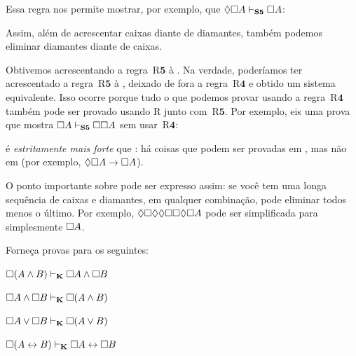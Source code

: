 Essa regra nos permite mostrar, por exemplo, que $\Diamond\Box A\vdash_{\mathbf{S5}}  \Box A$:
\begin{fitchproof}
	\PR
	\open
	\AS
	\open
	\AS
	\close
	\close
\end{fitchproof}

Assim, além de acrescentar caixas diante de diamantes, também podemos eliminar diamantes diante de caixas.

Obtivemos \mlSfive{} acrescentando a regra~R$\mathbf{5}$ à \mlSfour. Na
verdade, poderíamos ter acrescentado a regra~R$\mathbf{5}$ à \mlT{}, deixado de fora a
regra~R$\mathbf{4}$ e obtido um sistema equivalente. Isso ocorre porque
tudo o que podemos provar usando a regra~R$\mathbf{4}$ também pode ser provado
usando R\mlT{} junto com~R$\mathbf{5}$. Por exemplo, eis uma
prova que mostra $\Box A \vdash_{\mathbf{S5}} \Box\Box A$ sem
usar~R$\mathbf{4}$:
\begin{fitchproof}
	\PR
	\open
	\AS
	\close
	\open
	\AS
	\open
	\AS
	\open
	\AS
	\close
	\close
	\close
\end{fitchproof}
\mlSfive{} é \emph{estritamente mais forte} que \mlSfour: há coisas que podem ser provadas em \mlSfive, mas não em \mlSfour{} (por exemplo, $\Diamond\Box A \rightarrow \Box A$).

O ponto importante sobre \mlSfive{} pode ser expresso assim: se você tem uma longa sequência de caixas e diamantes, em qualquer combinação, pode eliminar todos menos o último. Por exemplo, $\Diamond\Box\Diamond\Diamond\Box\Box\Diamond\Box A$ pode ser simplificada para simplesmente $\Box A$.

\practiceproblems

\problempart
Forneça provas para os seguintes:
\begin{compactlist}
	\item $\Box (A\wedge B)\vdash_{\mathbf{K}}\Box A \wedge \Box B$
	\item $\Box A\wedge\Box B\vdash_{\mathbf{K}}\Box( A \wedge  B)$
	\item $\Box A\vee\Box B\vdash_{\mathbf{K}}\Box( A \vee  B)$
	\item $\Box (A \leftrightarrow B)\vdash_{\mathbf{K}} \Box A \leftrightarrow \Box B$
\end{compactlist}

